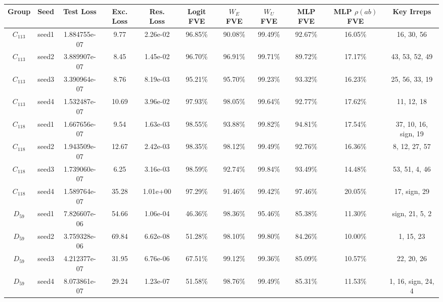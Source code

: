 \begin{tabular}{ccccccccccc}
\toprule
    Group &  Seed &    Test Loss & Exc. Loss & Res. Loss & Logit FVE & $W_E$ FVE & $W_U$ FVE & MLP FVE & MLP $\rho(ab)$ FVE &                      Key Irreps \\
\midrule
$C_{113}$ & seed1 & 1.884755e-07 &      9.77 &  2.26e-02 &   96.85\% &   90.08\% &   99.49\% & 92.67\% &            16.05\% &                      16, 30, 56 \\
$C_{113}$ & seed2 & 3.889907e-07 &      8.45 &  1.45e-02 &   96.70\% &   96.91\% &   99.71\% & 89.72\% &            17.17\% &                  43, 53, 52, 49 \\
$C_{113}$ & seed3 & 3.390964e-07 &      8.76 &  8.19e-03 &   95.21\% &   95.70\% &   99.23\% & 93.32\% &            16.23\% &                  25, 56, 33, 19 \\
$C_{113}$ & seed4 & 1.532487e-07 &     10.69 &  3.96e-02 &   97.93\% &   98.05\% &   99.64\% & 92.77\% &            17.62\% &                      11, 12, 18 \\
$C_{118}$ & seed1 & 1.667656e-07 &      9.54 &  1.63e-03 &   98.55\% &   93.88\% &   99.82\% & 94.81\% &            17.54\% &            37, 10, 16, sign, 19 \\
$C_{118}$ & seed2 & 1.943509e-07 &     12.67 &  2.42e-03 &   98.35\% &   98.12\% &   99.49\% & 92.76\% &            16.36\% &                   8, 12, 27, 57 \\
$C_{118}$ & seed3 & 1.739060e-07 &      6.25 &  3.16e-03 &   98.59\% &   92.74\% &   99.84\% & 93.49\% &            14.48\% &                   53, 51, 4, 46 \\
$C_{118}$ & seed4 & 1.589764e-07 &     35.28 &  1.01e+00 &   97.29\% &   91.46\% &   99.42\% & 97.46\% &            20.05\% &                    17, sign, 29 \\
 $D_{59}$ & seed1 & 7.826607e-06 &     54.66 &  1.06e-04 &   46.36\% &   98.36\% &   95.46\% & 85.38\% &            11.30\% &                  sign, 21, 5, 2 \\
 $D_{59}$ & seed2 & 3.759328e-06 &     69.84 &  6.62e-08 &   51.28\% &   98.10\% &   99.80\% & 84.26\% &            10.00\% &                       1, 15, 23 \\
 $D_{59}$ & seed3 & 4.212377e-07 &     31.95 &  6.76e-06 &   67.51\% &   99.12\% &   99.36\% & 85.09\% &            10.57\% &                      22, 20, 26 \\
 $D_{59}$ & seed4 & 8.073861e-07 &     29.24 &  1.23e-07 &   51.58\% &   98.76\% &   99.49\% & 85.31\% &            11.53\% &              1, 16, sign, 24, 4 \\

\end{tabular}

